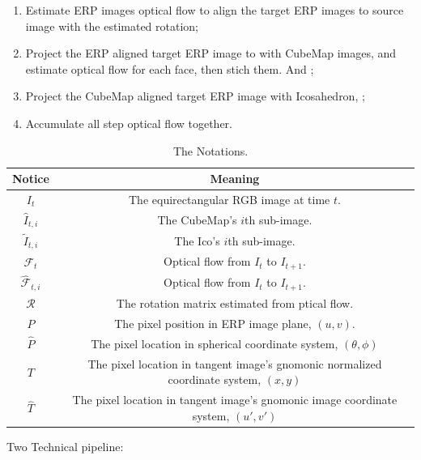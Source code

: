 \begin{enumerate}
	\item Estimate ERP images optical flow to align the target ERP images to source image with the estimated rotation;
	\item Project the ERP aligned target ERP image to with CubeMap images, and estimate optical flow for each face, then stich them. And ;
	\item Project the CubeMap aligned target ERP image with Icosahedron, ;
	\item Accumulate all step optical flow together.
\end{enumerate}

\begin{table}
	\begin{center}
		\begin{tabular}{ c | c } 
			\hline
			Notice & Meaning  \\ 
			\hline\hline
			$I_t$          & The equirectangular RGB image at time $t$. \\
			\hline
			$\hat{I}_{t,i}$ & The CubeMap's $i$th sub-image.\\
			\hline
			$\tilde{I}_{t,i}$ & The Ico's $i$th sub-image.\\
			\hline
			$\mathcal{F}_t$ & Optical flow from $I_t$ to $I_{t+1}$. \\
			\hline
			$\hat{\mathcal{F}}_{t,i}$ & Optical flow from $I_t$ to $I_{t+1}$. \\
			\hline
			$\mathcal{R}$   & The rotation matrix estimated from ptical flow. \\
			\hline
			$P$            & The pixel position in ERP image plane, $(u,v)$.   \\
			\hline
			$\hat{P}$      & The pixel location in spherical coordinate system, $(\theta, \phi)$ \\
			\hline
			$T$            & The pixel location in tangent image's gnomonic normalized coordinate system, $(x,y)$ \\
			\hline
			$\hat{T}$      & The pixel location in tangent image's gnomonic image coordinate system, $({u}',{v}')$ \\
			\hline
		\end{tabular}
	\end{center}
	\caption{The Notations.}
	\label{tab:approach:notation}
\end{table}


Two Technical pipeline:


